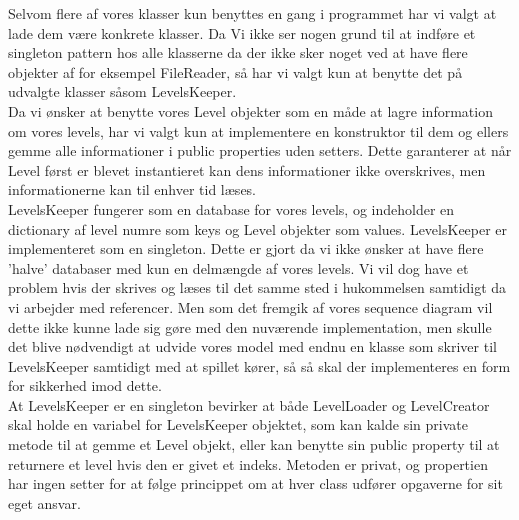 Selvom flere af vores klasser kun benyttes en gang i programmet har vi valgt at lade dem være konkrete klasser. Da Vi ikke ser nogen grund til at indføre et singleton pattern hos alle klasserne da der ikke sker noget ved at have flere objekter af for eksempel FileReader, så har vi valgt kun at benytte det på udvalgte klasser såsom LevelsKeeper.\\
Da vi ønsker at benytte vores Level objekter som en måde at lagre information om vores levels, har vi valgt kun at implementere en konstruktor til dem og ellers gemme alle informationer i public properties uden setters. Dette garanterer at når Level først er blevet instantieret kan dens informationer ikke overskrives, men informationerne kan til enhver tid læses.\\
LevelsKeeper fungerer som en database for vores levels, og indeholder en dictionary af level numre som keys og Level objekter som values. LevelsKeeper er implementeret som en singleton. Dette er gjort da vi ikke ønsker at have flere 'halve' databaser med kun en delmængde af vores levels. Vi vil dog have et problem hvis der skrives og læses til det samme sted i hukommelsen samtidigt da vi arbejder med referencer. Men som det fremgik af vores sequence diagram vil dette ikke kunne lade sig gøre med den nuværende implementation, men skulle det blive nødvendigt at udvide vores model med endnu en klasse som skriver til LevelsKeeper samtidigt med at spillet kører, så så skal der implementeres en form for sikkerhed imod dette.\\
At LevelsKeeper er en singleton bevirker at både LevelLoader og LevelCreator skal holde en variabel for LevelsKeeper objektet, som kan kalde sin private metode til at gemme et Level objekt, eller kan benytte sin public property til at returnere et level hvis den er givet et indeks. Metoden er privat, og propertien har ingen setter for at følge princippet om at hver class udfører opgaverne for sit eget ansvar.

